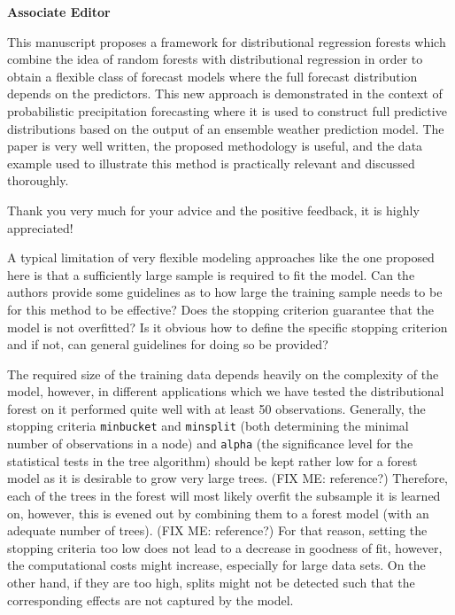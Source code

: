 \documentclass[american,foldmarks=false,noconfig]{uibklttr}
\newenvironment{review}{\fontshape{\itdefault}\fontseries{\bfdefault} \selectfont \smallskip}{\par}
\begin{document}
\textbf{\LARGE Associate Editor}

\begin{review}
This manuscript proposes a framework for distributional regression 
forests which combine the idea of random forests with distributional 
regression in order to obtain a flexible class of forecast models 
where the full forecast distribution depends on the predictors. 
This new approach is demonstrated in the context of probabilistic 
precipitation forecasting where it is used to construct full 
predictive distributions based on the output of an ensemble 
weather prediction model. The paper is very well written, the 
proposed methodology is useful, and the data example used to 
illustrate this method is practically relevant and discussed 
thoroughly.
\end{review}

Thank you very much for your advice and the positive feedback, 
it is highly appreciated!


\begin{review}
A typical limitation of very flexible modeling approaches like 
the one proposed here is that a sufficiently large sample is 
required to fit the model. Can the authors provide some 
guidelines as to how large the training sample needs to be for 
this method to be effective? Does the stopping criterion 
guarantee that the model is not overfitted? 
Is it obvious how to define the specific stopping criterion and 
if not, can general guidelines for doing so be provided?
\end{review}

The required size of the training data depends heavily on the complexity 
of the model, however, in different applications which we have tested the 
distributional forest on it performed quite well with at least 50 observations. 
Generally, the stopping criteria \texttt{minbucket} and \texttt{minsplit} (both 
determining the minimal number of observations in a node) and \texttt{alpha} 
(the significance level for the statistical tests in the tree algorithm) should 
be kept rather low for a forest model as it is desirable to grow very large trees. 
(FIX ME: reference?)
Therefore, each of the trees in the forest will most likely overfit the subsample 
it is learned on, however, this is evened out by combining them to a forest 
model (with an adequate number of trees). (FIX ME: reference?) 
For that reason, setting the stopping criteria too low does not lead to a decrease 
in goodness of fit, however, the computational costs might increase, especially for 
large data sets. On the other hand, if they are too high, splits might not be detected 
such that the corresponding effects are not captured by the model.
\end{document}
